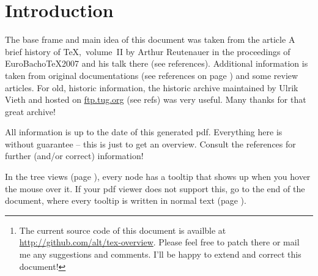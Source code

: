 \documentclass[
%
]{scrartcl}
\begin{document}
\begin{abstract}
{\centering \large \hyperref[textextview]{Link for the impatient.}\\[2ex]}
In the world of \TeX, there are many developments and ambiguous names. This paper tries to give an overview of the development of \TeX\ and related programs. Contributions are welcome!\footnote{The current source code of this document is availble at \url{http://github.com/alt/tex-overview}. Please feel free to patch there or mail me any suggestions and comments. I'll be happy to extend and correct this document!}\\
\end{abstract}

\section{Introduction}
The base frame and main idea of this document was taken from the article \textsf{A brief history of \TeX,~volume~II} by Arthur Reutenauer in the proceedings of \textsf{EuroBacho\TeX 2007} and his talk there (see references). Additional information is taken from original documentations (see references on page \pageref{sec:refs}) and some review articles. For old, historic information, the \textsf{historic archive} maintained by Ulrik Vieth and hosted on \url{ftp.tug.org} (see refs) was very useful. Many thanks for that great archive!

All information is up to the date of this generated pdf. Everything here is without guarantee – this is just to get an overview. Consult the references for further (and/or correct) information! 

In the tree views (page \pageref{sec:tree}), every node has a tooltip that shows up when you hover the mouse over it. If your pdf viewer does not support this, go to the end of the document, where every tooltip is written in normal text (page \pageref{sec:text}).
\end{document}
